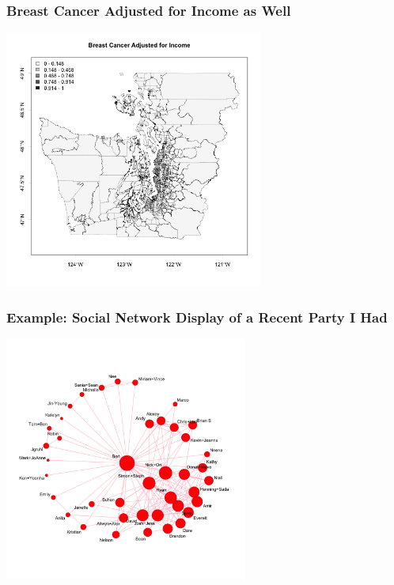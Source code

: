 \documentclass[handout]{beamer}
\begin{document}
\begin{frame}[fragile]
\frametitle{Breast Cancer Adjusted for Income as Well}
\begin{center}
\includegraphics[width=8.5cm]{figure/breast_new.png}
\end{center}
\end{frame}


\begin{frame}[fragile]
\frametitle{Example: Social Network Display of a Recent Party I Had}
\begin{center}
\includegraphics[width=8cm]{figure/network.png}
\end{center}
\end{frame}
\end{document}
